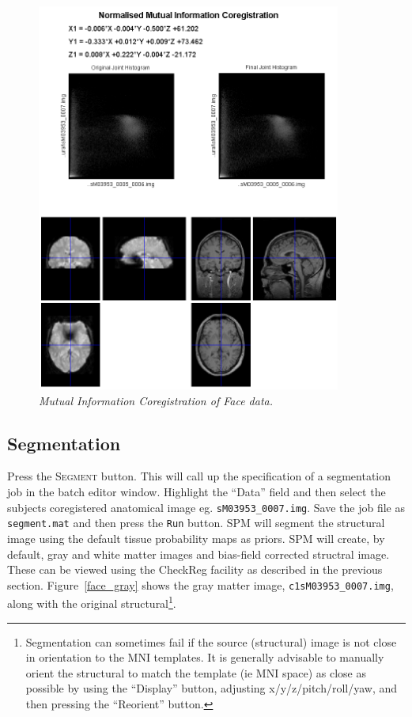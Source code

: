 \begin{figure}
\begin{center}
\includegraphics[width=100mm]{faces/coreg}
\caption{\em Mutual Information Coregistration of Face data.\label{face_coreg}}
\end{center}
\end{figure}

\subsection{Segmentation}

Press the \textsc{Segment} button. This will call up the specification of a segmentation job in the batch editor window. Highlight the ``Data'' field and then select the subjects coregistered anatomical image eg. \texttt{sM03953\_0007.img}. Save the job file as \texttt{segment.mat} and then press the \texttt{Run} button. SPM will segment the structural image using the default tissue probability maps as priors. 
SPM will create, by default, gray and white matter images and bias-field corrected structral image. These can be viewed using the CheckReg facility as described in the previous section. Figure~\ref{face_gray} shows the gray matter image, \texttt{c1sM03953\_0007.img}, along with the original structural\footnote{Segmentation can sometimes fail if the source (structural) image is not close in orientation to the MNI templates. It is generally advisable to manually orient the structural to match the template (ie MNI space) as close as possible by using the ``Display'' button, adjusting x/y/z/pitch/roll/yaw, and then pressing the ``Reorient'' button.}.

